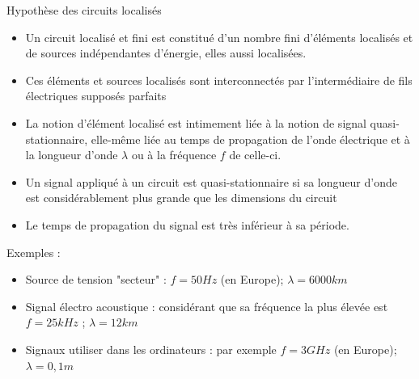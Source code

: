 \begin{frame}[allowframebreaks]{Hypothèse des circuits localisés}
  \begin{itemize}
    \item Un circuit localisé et fini est constitué d’un nombre fini d’éléments localisés et de sources indépendantes d’énergie, elles aussi localisées.
    \item Ces éléments et sources localisés sont interconnectés par l’intermédiaire de fils électriques supposés parfaits
    \item La notion d’élément localisé est intimement liée à la notion de signal quasi-stationnaire, elle-même liée au temps de propagation de l’onde électrique et à la longueur d’onde $\lambda$ ou à la fréquence $f$ de celle-ci.
    \item Un signal appliqué à un circuit est quasi-stationnaire si sa longueur d’onde est considérablement plus grande que les dimensions du circuit 
    \item Le temps de propagation du signal est très inférieur à sa période.  
  \end{itemize}
  
  Exemples : 
  \begin{itemize}
    \item Source de tension "secteur" : $f= 50 Hz$ (en Europe); $\lambda = 6000 km$
    \item Signal électro acoustique : considérant que sa fréquence la plus élevée est $f= 25 kHz$ ; $\lambda= 12km$
    \item Signaux utiliser dans les ordinateurs : par exemple $f= 3GHz$ (en Europe); $\lambda= 0,1 m$
  \end{itemize}
\end{frame}


